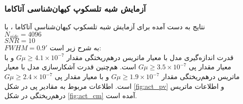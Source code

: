   	
  	
  	
  	
\subsubsection{آزمایش‌ شبه تلسکوپ کیهان‌شناسی آتاکاما}
  	نتایج به دست آمده برای آزمایش شبه تلسکوپ کیهان‌شناسی آتاکاما ، با\\
  	$N_{side} = 4096$ \\
  	$SNR=10$\\
  	$FWHM = 0.9'$
  	به شرح زیر است:\\
  	قدرت اندازه‌گیری مدل با معیار ماتریس در‌هم‌ریختگی مقدار 
  	$G\mu \geq 4.1\times 10^{-7}$
  	و با معیار مقدار پی 
  	$G\mu \geq 3.5\times 10^{-7}$
  	است. هم‌چنین قدرت آشکارسازی مدل با معیار ماتریس در‌هم‌ریختگی مقدار
  	$G\mu \geq 1.9\times 10^{-7}$
  	و با معیار مقدار پی 
  	$G\mu \geq 2.4\times 10^{-7}$
  	است.
  	اطلاعات مربوط به مقادیر پی در شکل
  	\ref{fig:act_pv}
  	و اطلاعات ماتریس درهم‌ریختگی در شکل
  	\ref{fig:act_cm}
  	آمده است.
  	

